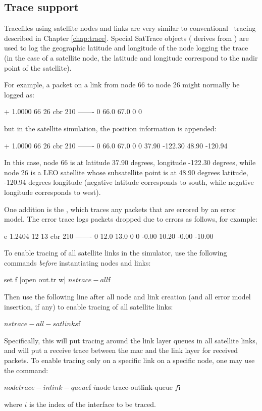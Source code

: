 
\subsection{Trace support}
\label{sec:satellite/usage/trace}

Tracefiles using satellite nodes and links are very similar to conventional
\ns~tracing described in Chapter \ref{chap:trace}.  Special SatTrace objects
( derives from ) are used
to log the geographic latitude and longitude of the node logging the trace
(in the case of a satellite node, the latitude and longitude correspond
to the nadir point of the satellite).

For example, a packet on a link from node 66 to node 26 might normally be
logged as:  
\begin{program}
+ 1.0000 66 26 cbr 210 ------- 0 66.0 67.0 0 0 
\end{program}
but in the satellite simulation, the position information is appended:
\begin{program}
+ 1.0000 66 26 cbr 210 ------- 0 66.0 67.0 0 0 37.90 -122.30 48.90 -120.94
\end{program}
In this case, node 66 is at latitude 37.90 degrees, longitude -122.30
degrees, while node 26 is a LEO satellite whose subsatellite
point is at 48.90 degrees latitude, -120.94 degrees longitude (negative
latitude corresponds to south, while negative longitude corresponds to
west).

One addition is the , which traces any packets
that are errored by an error model.  The error trace logs packets dropped
due to errors as follows, for example:  
\begin{program}
e 1.2404 12 13 cbr 210 ------- 0 12.0 13.0 0 0 -0.00 10.20 -0.00 -10.00
\end{program}

To enable tracing of all satellite links in the simulator, use the following
commands {\em before} instantiating nodes and links:
\begin{program}
set f [open out.tr w]
$ns trace-all $f
\end{program}
Then use the following line after all node and link creation (and all
error model insertion, if any) to enable tracing of all satellite links:
\begin{program}
$ns trace-all-satlinks $f
\end{program}
Specifically, this will put tracing around the link layer queues in all
satellite links, and will put a receive trace between the mac and the
link layer for received packets.  To enable tracing only on a specific
link on a specific node, one may use the command:
\begin{program}
$node trace-inlink-queue $f $i
$node trace-outlink-queue $f $i
\end{program}
where $i$ is the index of the interface to be traced.  

